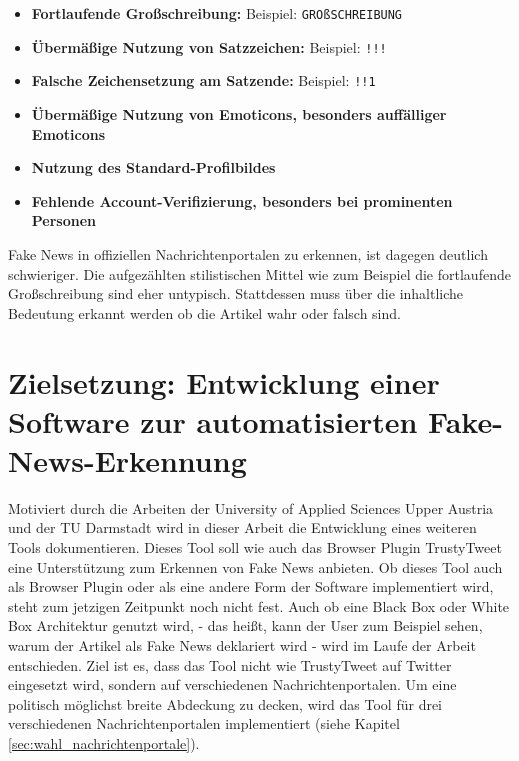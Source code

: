 \begin{itemize}
    \item \textbf{Fortlaufende Großschreibung:} Beispiel: \texttt{GROßSCHREIBUNG}
    
    \item \textbf{Übermäßige Nutzung von Satzzeichen:} Beispiel: \texttt{!!!}
    
    \item \textbf{Falsche Zeichensetzung am Satzende:} Beispiel: \texttt{!!1}
    
    \item \textbf{Übermäßige Nutzung von Emoticons, besonders auffälliger Emoticons}
    
    \item \textbf{Nutzung des Standard-Profilbildes}
    
    \item \textbf{Fehlende Account-Verifizierung, besonders bei prominenten Personen}
\end{itemize}

Fake News in offiziellen Nachrichtenportalen zu erkennen, ist dagegen deutlich schwieriger.
Die aufgezählten stilistischen Mittel wie zum Beispiel die fortlaufende Großschreibung sind eher untypisch.
Stattdessen muss über die inhaltliche Bedeutung erkannt werden ob die Artikel wahr oder falsch sind.

\section{Zielsetzung: Entwicklung einer Software zur automatisierten Fake-News-Erkennung}
\label{sec:zielsetzung}

Motiviert durch die Arbeiten der University of Applied Sciences Upper Austria \cite{Simone2022} und der TU Darmstadt \cite{Hartwig2021} wird in 
dieser Arbeit die Entwicklung eines weiteren Tools dokumentieren.
Dieses Tool soll wie auch das Browser Plugin TrustyTweet eine Unterstützung zum Erkennen von Fake News anbieten.
Ob dieses Tool auch als Browser Plugin oder als eine andere Form der Software implementiert wird, steht zum jetzigen Zeitpunkt noch nicht fest.
Auch ob eine Black Box oder White Box Architektur genutzt wird, - das heißt, kann der User zum Beispiel sehen, warum der Artikel als Fake News 
deklariert wird - wird im Laufe der Arbeit entschieden.
Ziel ist es, dass das Tool nicht wie TrustyTweet auf Twitter eingesetzt wird, sondern auf verschiedenen Nachrichtenportalen.
Um eine politisch möglichst breite Abdeckung zu decken, wird das Tool für drei verschiedenen Nachrichtenportalen implementiert 
(siehe Kapitel \ref{sec:wahl_nachrichtenportale}).

